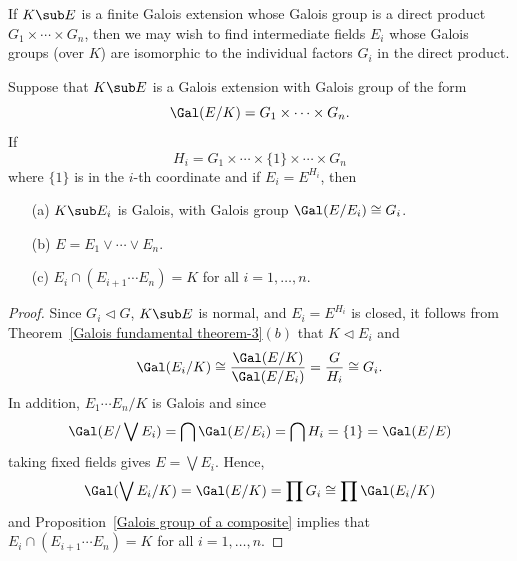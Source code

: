 If $K\sub E$ is a finite Galois extension whose Galois group is a direct product $G_1\times\cdots\times G_n$, then we may wish to find intermediate fields $E_i$ whose Galois groups (over $K$) are isomorphic to the individual factors $G_i$ in the direct product.
\begin{corollary}\label{Galois group is a product}
Suppose that $K\sub E$ is a Galois extension with Galois group of the form
\[\Gal(E/K)=G_1\times\cdots\times G_n.\]
If
\[H_i=G_1\times\cdots\times\{1\}\times\cdots\times G_n\]
where $\{1\}$ is in the $i$-th coordinate and if $E_i=E^{H_i}$, then
\begin{itemize}
\item[(a)] $K\sub E_i$ is Galois, with Galois group $\Gal(E/E_i)\cong G_i$.
\item[(b)] $E=E_1\vee\cdots\vee E_n$.
\item[(c)] $E_i\cap(E_{i+1}\cdots E_n)=K$ for all $i=1,\dots,n$.
\end{itemize}
\end{corollary}
\begin{proof}
Since $G_i\lhd G$, $K\sub E$ is normal, and $E_i=E^{H_i}$ is closed, it follows from Theorem~\ref{Galois fundamental theorem-3}$(b)$ that $K\lhd E_i$ and
\[\Gal(E_i/K)\cong\frac{\Gal(E/K)}{\Gal(E/E_i)}=\frac{G}{H_i}\cong G_i.\]
In addition, $E_1\cdots E_n/K$ is Galois and since
\[\Gal(E/\bigvee E_i)=\bigcap\Gal(E/E_i)=\bigcap H_i=\{1\}=\Gal(E/E)\]
taking fixed fields gives $E=\bigvee E_i$. Hence,
\[\Gal(\bigvee E_i/K)=\Gal(E/K)=\prod G_i\cong\prod\Gal(E_i/K)\]
and Proposition~\ref{Galois group of a composite} implies that $E_i\cap(E_{i+1}\cdots E_n)=K$ for all $i=1,\dots,n$.
\end{proof}
